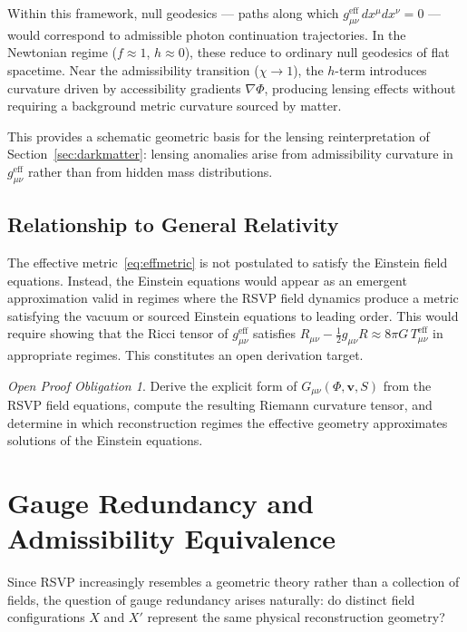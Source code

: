 \documentclass[11pt, a4paper]{article}
\theoremstyle{plain}
\theoremstyle{definition}
\theoremstyle{remark}
\newtheorem{obligation}[theorem]{Open Proof Obligation}
\begin{document}
Within this framework, null geodesics --- paths along which $g_{\mu\nu}^{\mathrm{eff}}
\,dx^\mu dx^\nu = 0$ --- would correspond to admissible photon continuation trajectories.
In the Newtonian regime ($f \approx 1$, $h \approx 0$), these reduce to ordinary
null geodesics of flat spacetime. Near the admissibility transition ($\chi \to 1$),
the $h$-term introduces curvature driven by accessibility gradients $\nabla\Phi$,
producing lensing effects without requiring a background metric curvature sourced by
matter.

This provides a schematic geometric basis for the lensing reinterpretation of
Section~\ref{sec:darkmatter}: lensing anomalies arise from admissibility curvature in
$g_{\mu\nu}^{\mathrm{eff}}$ rather than from hidden mass distributions.

\subsection{Relationship to General Relativity}

The effective metric~\eqref{eq:effmetric} is not postulated to satisfy the Einstein
field equations. Instead, the Einstein equations would appear as an emergent
approximation valid in regimes where the RSVP field dynamics produce a metric
satisfying the vacuum or sourced Einstein equations to leading order. This would
require showing that the Ricci tensor of $g_{\mu\nu}^{\mathrm{eff}}$ satisfies
$R_{\mu\nu} - \frac{1}{2}g_{\mu\nu}R \approx 8\pi G\, T_{\mu\nu}^{\mathrm{eff}}$
in appropriate regimes. This constitutes an open derivation target.

\begin{obligation}
\label{obl:metric}
Derive the explicit form of $G_{\mu\nu}(\Phi, \mathbf{v}, S)$ from the RSVP field
equations, compute the resulting Riemann curvature tensor, and determine in which
reconstruction regimes the effective geometry approximates solutions of the Einstein
equations.
\end{obligation}

\section{Gauge Redundancy and Admissibility Equivalence}
\label{app:gauge}

Since RSVP increasingly resembles a geometric theory rather than a collection of
fields, the question of gauge redundancy arises naturally: do distinct field
configurations $X$ and $X'$ represent the same physical reconstruction geometry?
\end{document}
